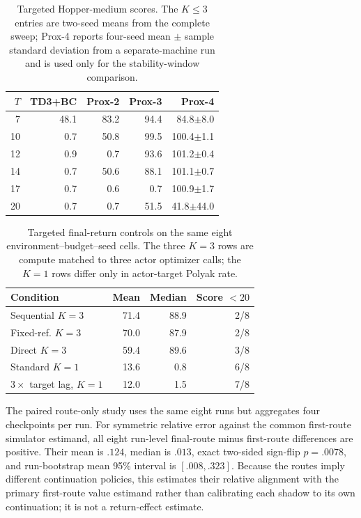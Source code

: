 \documentclass[letterpaper]{article}
\begin{document}
\begin{table}[t]
\centering
\small
\begin{tabular}{rrrrr}
\toprule
$T$ & TD3+BC & Prox-2 & Prox-3 & Prox-4\\
\midrule
7  &48.1&83.2&94.4&84.8$\pm$8.0\\
10 &0.7&50.8&99.5&100.4$\pm$1.1\\
12 &0.9&0.7&93.6&101.2$\pm$0.4\\
14 &0.7&50.6&88.1&101.1$\pm$0.7\\
17 &0.7&0.6&0.7&100.9$\pm$1.7\\
20 &0.7&0.7&51.5&41.8$\pm$44.0\\
\bottomrule
\end{tabular}
\caption{Targeted Hopper-medium scores. The $K\le3$ entries are two-seed means from the complete sweep; Prox-4 reports four-seed mean $\pm$ sample standard deviation from a separate-machine run and is used only for the stability-window comparison.}
\label{tab:hopper_k4}
\end{table}

\begin{table}[t]
\centering
\small
\begin{tabular}{lrrr}
\toprule
Condition & Mean & Median & Score $<20$\\
\midrule
Sequential $K=3$ &71.4&88.9&2/8\\
Fixed-ref. $K=3$ &70.0&87.9&2/8\\
Direct $K=3$ &59.4&89.6&3/8\\
\midrule
Standard $K=1$ &13.6&0.8&6/8\\
$3\times$ target lag, $K=1$ &12.0&1.5&7/8\\
\bottomrule
\end{tabular}
\caption{Targeted final-return controls on the same eight environment--budget--seed cells. The three $K=3$ rows are compute matched to three actor optimizer calls; the $K=1$ rows differ only in actor-target Polyak rate.}
\label{tab:targeted_controls}
\end{table}

The paired route-only study uses the same eight runs but aggregates four checkpoints per run. For symmetric relative error against the common first-route simulator estimand, all eight run-level final-route minus first-route differences are positive. Their mean is $.124$, median is $.013$, exact two-sided sign-flip $p=.0078$, and run-bootstrap mean 95\% interval is $[.008,.323]$. Because the routes imply different continuation policies, this estimates their relative alignment with the primary first-route value estimand rather than calibrating each shadow to its own continuation; it is not a return-effect estimate.
\end{document}
